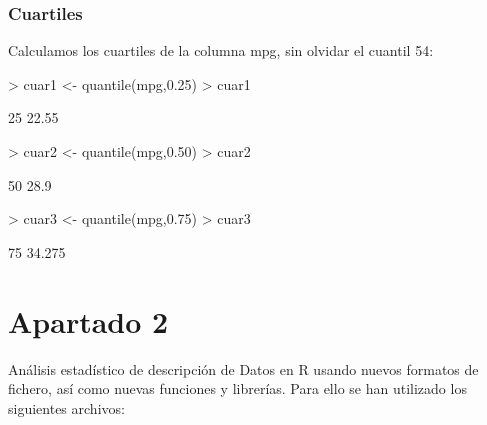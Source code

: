 \documentclass [a4paper] {article}
\begin{document}
\subsubsection{Cuartiles}
Calculamos los cuartiles de la columna mpg, sin olvidar el cuantil 54:
\begin{Schunk}
\begin{Sinput}
> cuar1 <- quantile(mpg,0.25)
> cuar1
\end{Sinput}
\begin{Soutput}
  25% 
22.55 
\end{Soutput}
\begin{Sinput}
> cuar2 <- quantile(mpg,0.50)
> cuar2
\end{Sinput}
\begin{Soutput}
 50% 
28.9 
\end{Soutput}
\begin{Sinput}
> cuar3 <- quantile(mpg,0.75)
> cuar3
\end{Sinput}
\begin{Soutput}
   75% 
34.275 
\end{Soutput}
\end{Schunk}

\section{Apartado 2}
Análisis estadístico de descripción de Datos en R usando nuevos formatos de fichero, así como nuevas funciones y librerías.
Para ello se han utilizado los siguientes archivos:
\end{document}
